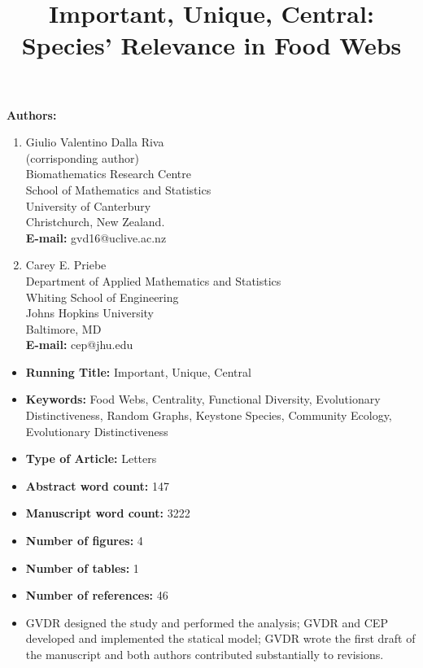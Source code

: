 \documentclass[12pt]{article}
\begin{document}
\title{Important, Unique, Central: Species' Relevance in Food Webs}

\linenumbers

\maketitle

\begin{scriptsize}

\textbf{Authors:}
\begin{enumerate}
  \item Giulio Valentino Dalla Riva\\
	(corrisponding author)\\
	Biomathematics Research Centre\\
	School of Mathematics and Statistics\\
	University of Canterbury\\
	Christchurch, New Zealand.\\
	\textbf{E-mail:} gvd16@uclive.ac.nz
  \item	Carey E. Priebe\\
	Department of Applied Mathematics and Statistics\\
        Whiting School of Engineering\\
        Johns Hopkins University\\
	Baltimore, MD\\
	\textbf{E-mail:} cep@jhu.edu
\end{enumerate}

\begin{itemize}
\item \textbf{Running Title:} Important, Unique, Central
\item \textbf{Keywords:} Food Webs, Centrality, Functional Diversity, Evolutionary Distinctiveness, Random Graphs, Keystone Species, Community Ecology, Evolutionary Distinctiveness
\item \textbf{Type of Article:} Letters
\item \textbf{Abstract word count:} 147
\item \textbf{Manuscript word count:} 3222
\item \textbf{Number of figures:} 4
\item \textbf{Number of tables:} 1
\item \textbf{Number of references:} 46
\item GVDR designed the study and performed the analysis; GVDR and CEP developed and implemented the statical model; GVDR wrote the first draft of the manuscript and both authors contributed substantially to revisions.
\end{itemize}

\end{scriptsize}
\end{document}

